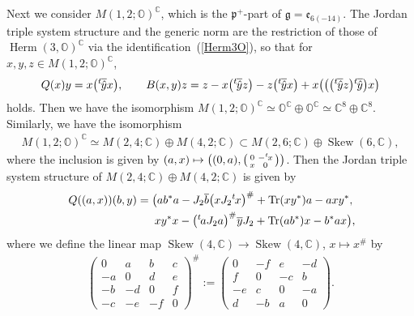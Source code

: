 \documentclass[pdftex]{sigma}
\numberwithin{equation}{section}
\newcommand{\BC}{\mathbb{C}}
\newcommand{\BO}{\mathbb{O}}
\newcommand{\fg}{\mathfrak{g}}
\newcommand{\fp}{\mathfrak{p}}
\newcommand{\Tr}{\operatorname{Tr}}
\newcommand{\Skew}{\operatorname{Skew}}
\newcommand{\Herm}{\operatorname{Herm}}
\begin{document}
Next we consider $M(1,2;\BO)^\BC$, which is the $\fp^+$-part of $\fg=\mathfrak{e}_{6(-14)}$.
The Jordan triple system structure and the generic norm are the restriction of those of $\Herm(3,\BO)^\BC$ via the identification~(\ref{Herm3O}),
so that for $x,y,z\in M(1,2;\BO)^\BC$,
\begin{gather*} Q(x)y=x\big({}^t\hspace{-1pt}\overline{\hat{y}}x\big),\qquad
B(x,y)z=z-x\big({}^t\hspace{-1pt}\overline{\hat{y}}z\big)-z\big({}^t\hspace{-1pt}\overline{\hat{y}}x\big)
+x\big(\big(\big({}^t\hspace{-1pt}\overline{\hat{y}}z\big){}^t\hspace{-1pt}\overline{\hat{y}}\big)x\big) \end{gather*}
holds. Then we have the isomorphism $M(1,2;\BO)^\BC\simeq\BO^\BC\oplus\BO^\BC\simeq\BC^8\oplus\BC^8$.
Similarly, we have the isomorphism
\begin{gather*} M(1,2;\BO)^\BC\simeq M(2,4;\BC)\oplus M(4,2;\BC)\subset M(2,6;\BC)\oplus\Skew(6,\BC), \end{gather*}
where the inclusion is given by $(a,x)\mapsto\left((0,a),\left(\begin{smallmatrix}0&-{}^t\hspace{-1pt}x\\x&0\end{smallmatrix}\right)\right)$.
Then the Jordan triple system structure of $M(2,4;\BC)\oplus M(4,2;\BC)$ is given by
\begin{gather*}
Q((a,x))(b,y)=\big(ab^*a-J_2\overline{b}\big(xJ_2{}^t\hspace{-1pt}x\big)^\#+\Tr(xy^*)a-axy^*,\\
\hphantom{Q((a,x))(b,y)=\big(}{} xy^*x-\big({}^t\hspace{-1pt}aJ_2a\big)^\#\overline{y}J_2+\Tr(ab^*)x-b^*ax\big),
\end{gather*}
where we define the linear map $\Skew(4,\BC)\to\Skew(4,\BC)$, $x\mapsto x^\#$ by
\begin{gather}\label{adjoint4}
\begin{pmatrix}0&a&b&c\\-a&0&d&e\\-b&-d&0&f\\-c&-e&-f&0\end{pmatrix}^\#
:=\begin{pmatrix}0&-f&e&-d\\f&0&-c&b\\-e&c&0&-a\\d&-b&a&0\end{pmatrix}.
\end{gather}
\end{document}
